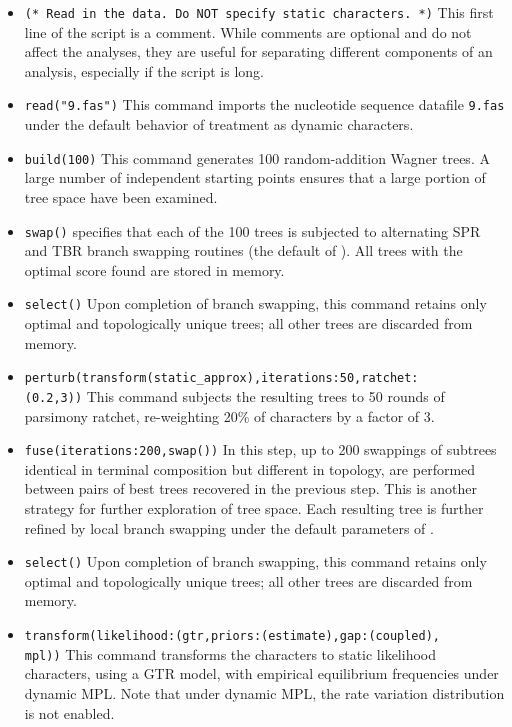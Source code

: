\begin{itemize}
\item \texttt{(* Read in the data. Do NOT specify static characters. *)} This first line of the script is a comment. 
While comments are optional and do not affect the analyses, they are useful for separating different components 
of an analysis, especially if the script is long.
\item \texttt{read("9.fas")}
This command imports the nucleotide sequence datafile \texttt{9.fas} under the default behavior of treatment as 
dynamic characters.
\item \texttt{build(100)} This command generates 100 random-addition Wagner trees. A large number of 
independent starting points ensures that a large portion of tree space have been examined.
\item \texttt{swap()}  specifies that each of the 100 trees is subjected to alternating SPR and 
TBR branch swapping routines (the default of \poy). All trees with the optimal score found are stored in memory.
\item \texttt{select()} Upon completion of branch swapping, this command retains only optimal and topologically 
unique trees; all other trees are discarded from memory. 
\item \texttt{perturb(transform(static\_approx),iterations:50,ratchet:\\(0.2,3))} This command subjects the resulting 
trees to 50 rounds of parsimony ratchet, re-weighting 20\% of characters by a factor of 3.
\item \texttt{fuse(iterations:200,swap())} In this step, up to 200 swappings of subtrees identical in terminal 
composition but different in topology, are performed between pairs of best trees recovered in the previous step. 
This is another strategy for further exploration of tree space. Each resulting tree is further refined by local branch
 swapping under the default parameters of .
\item \texttt{select()} Upon completion of branch swapping, this command retains only optimal and topologically
 unique trees; all other trees are discarded from memory.
\item \texttt{transform(likelihood:(gtr,priors:(estimate),gap:(coupled),\\mpl))} This command transforms the 
characters to static likelihood characters, using a GTR model, with empirical equilibrium frequencies under 
dynamic MPL. Note that under dynamic MPL, the rate variation distribution is not enabled.

\end{itemize}
